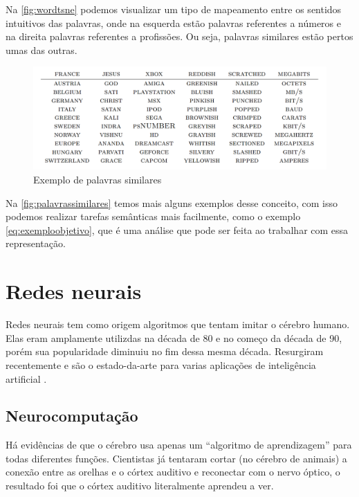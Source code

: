 Na \autoref{fig:wordtsne} podemos visualizar um tipo de mapeamento entre os sentidos intuitivos das palavras, onde na esquerda estão palavras referentes a números e na direita palavras referentes a profissões. Ou seja, palavras similares estão pertos umas das outras.

\begin{figure}[htb]
  \caption{Exemplo de palavras similares}\label{fig:palavrassimilares}
  \begin{center}
      \includegraphics[scale=0.35]{img/Colbert-WordTable2}
  \end{center}
\end{figure}

Na \autoref{fig:palavrassimilares} temos mais alguns exemplos desse conceito, com isso podemos realizar tarefas semânticas mais facilmente, como o exemplo \ref{eq:exemploobjetivo}, que é uma análise que pode ser feita ao trabalhar com essa representação.



\section{Redes neurais}\label{sec:redesneurais}

Redes neurais tem como origem algoritmos que tentam imitar o cérebro humano. Elas eram amplamente utilizdas na década de 80 e no começo da década de 90, porém sua popularidade diminuiu no fim dessa mesma década. Resurgiram recentemente e são o estado-da-arte para varias aplicações de inteligência artificial \cite{machinelearningcoursera}.

\subsection{Neurocomputação}

Há evidências de que o cérebro usa apenas um ``algoritmo de aprendizagem'' para todas diferentes funções. Cientistas já tentaram cortar (no cérebro de animais) a conexão entre as orelhas e o córtex auditivo e reconectar com o nervo óptico, o resultado foi que o córtex auditivo literalmente aprendeu a ver. 

